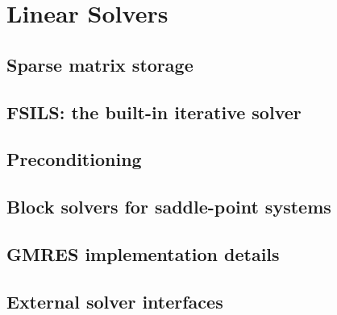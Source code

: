 \chapter{Linear Solvers}
\label{ch:solvers}

\section{Sparse matrix storage}
\label{sec:solvers:sparse}


\section{FSILS: the built-in iterative solver}
\label{sec:solvers:fsils}


\section{Preconditioning}
\label{sec:solvers:preconditioners}


\section{Block solvers for saddle-point systems}
\label{sec:solvers:block}


\section{GMRES implementation details}
\label{sec:solvers:gmres}


\section{External solver interfaces}
\label{sec:solvers:external}

